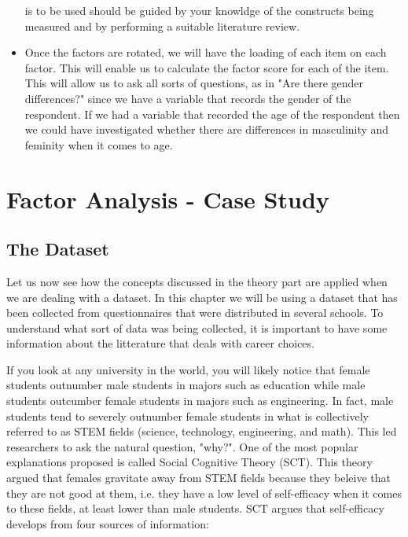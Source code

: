 \documentclass[a4paper,12pt,oneside]{book}
\begin{document}
\begin{itemize}
	is to be used should be guided by your knowldge of the constructs being measured and by performing a suitable literature review. 
	\item Once the factors are rotated, we will have the loading of each item on each factor. This will enable us to calculate the factor score for
	each of the item. This will allow us to ask all sorts of questions, as in "Are there gender differences?" since we have a variable that records
	the gender of the respondent. If we had a variable that recorded the age of the respondent then we could have investigated whether there are
	differences in masculinity and feminity when it comes to age. 
\end{itemize}

\chapter{Factor Analysis - Case Study}
\section{The Dataset}
Let us now see how the concepts discussed in the theory part are applied when we are dealing with a dataset. In this chapter we will be using a
dataset that has been collected from questionnaires that were distributed in several schools. To understand what sort of data was being collected, 
it is important to have some information about the litterature that deals with career choices.

If you look at any university in the world, you will likely notice that female students outnumber male students in majors such as education while
male students outcumber female students in majors such as engineering. In fact, male students tend to severely outnumber female students in
what is collectively referred to as STEM fields (science, technology, engineering, and math). This led researchers to ask the natural question, "why?".
One of the most popular explanations proposed is called Social Cognitive Theory (SCT). This theory argued that females gravitate away from STEM 
fields because they beleive that they are not good at them, i.e. they have a low level of self-efficacy when it comes to these fields, at least
lower than male students. SCT argues that self-efficacy develops from four sources of information:
\end{document}
